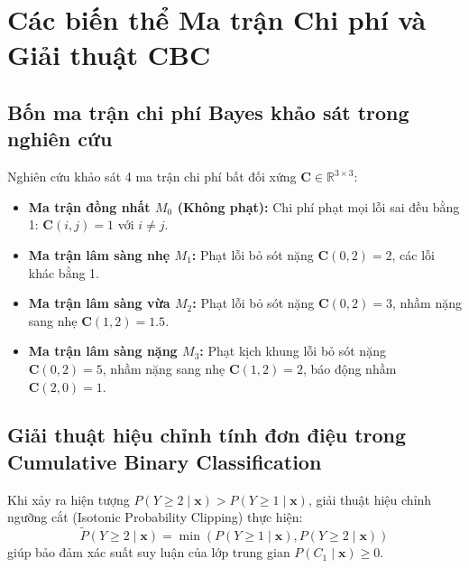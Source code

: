 \chapter{Các biến thể Ma trận Chi phí và Giải thuật CBC}
\label{app:cost-matrices}

\section{Bốn ma trận chi phí Bayes khảo sát trong nghiên cứu}
Nghiên cứu khảo sát 4 ma trận chi phí bất đối xứng $\mathbf{C} \in \mathbb{R}^{3 \times 3}$:
\begin{itemize}
    \item \textbf{Ma trận đồng nhất $M_0$ (Không phạt):} Chi phí phạt mọi lỗi sai đều bằng 1: $\mathbf{C}(i, j) = 1$ với $i \ne j$.
    \item \textbf{Ma trận lâm sàng nhẹ $M_1$:} Phạt lỗi bỏ sót nặng $\mathbf{C}(0, 2) = 2$, các lỗi khác bằng 1.
    \item \textbf{Ma trận lâm sàng vừa $M_2$:} Phạt lỗi bỏ sót nặng $\mathbf{C}(0, 2) = 3$, nhầm nặng sang nhẹ $\mathbf{C}(1, 2) = 1.5$.
    \item \textbf{Ma trận lâm sàng nặng $M_3$:} Phạt kịch khung lỗi bỏ sót nặng $\mathbf{C}(0, 2) = 5$, nhầm nặng sang nhẹ $\mathbf{C}(1, 2) = 2$, báo động nhầm $\mathbf{C}(2, 0) = 1$.
\end{itemize}

\section{Giải thuật hiệu chỉnh tính đơn điệu trong Cumulative Binary Classification}
Khi xảy ra hiện tượng $P(Y \ge 2 \mid \mathbf{x}) > P(Y \ge 1 \mid \mathbf{x})$, giải thuật hiệu chỉnh ngưỡng cắt (Isotonic Probability Clipping) thực hiện:
\begin{equation}
    \tilde{P}(Y \ge 2 \mid \mathbf{x}) = \min\left(P(Y \ge 1 \mid \mathbf{x}), P(Y \ge 2 \mid \mathbf{x})\right)
\end{equation}
giúp bảo đảm xác suất suy luận của lớp trung gian $P(C_1 \mid \mathbf{x}) \ge 0$.

